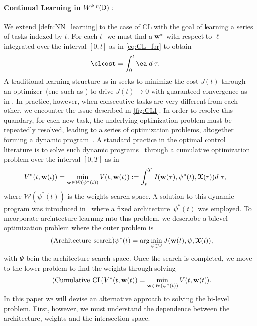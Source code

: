 \paragraph{Continual Learning in $W^{k,p}(\mathrm{D}):$}
We  extend \cref{defn:NN_learning} to the case of CL  with the goal of learning a series of tasks indexed by $t.$ For each $t,$ we must find a $\boldsymbol{\mathrm{w}}^*$  with respect to $\ell$ integrated over the interval $[0,t]$ as in \cref{eq:CL_for} to obtain
\begin{align*}
    \clcost & = \int_0^t \ea \;  d~\tau.
\end{align*}
A traditional learning structure as in \cite{CASpasunuru2019continual} seeks to minimize the cost $J(t)$ through an  optimizer~(one such as \cite{kingmaAdamMethodStochastic2017}) to drive $J(t) \rightarrow 0$ with guaranteed convergence as in \cite{kingmaAdamMethodStochastic2017}. In practice, however, when consecutive tasks are very different from each other, we encounter the issue described in \cref{fig:CL1}.  In order to resolve this quandary, for each new task, the underlying optimization problem must be repeatedly resolved, leading to a  series of optimization problems, altogether forming a dynamic program~\cite{bertsekas2012dynamic}. A standard practice in the optimal control literature is to solve such dynamic programs~\cite{bertsekas2012dynamic} through a cumulative optimization problem over the interval $[0,T]$ as in 
\begin{align*}
    V^*(t,\boldsymbol{\mathrm{w}}(t)) & = \min_{\boldsymbol{\mathrm{w}} \in \mathcal{W}(\psi^*(t))} V(t, \boldsymbol{\mathrm{w}}(t) ):= \int_t^T J(\boldsymbol{\mathrm{w}}(\tau),\psi^*(t), \boldsymbol{\mathcal{X}}(\tau)) d~\tau,
\end{align*}
where $\mathcal{W}(\psi^*(t))$ is the weights search space. A solution to this dynamic program was introduced in~\cite{raghavan2021formalizing, chakraborty2025understanding} where a fixed architecture~$\psi^*(t)$ was employed.  To incorporate architecture learning into this problem, we descriobe a bilevel- optimization problem where the outer problem is  
\begin{align}\label{eq:arch} \tag{Architecture search}
    \psi^*(t) & = \mathrm{arg }\min_{\psi\in \Psi} J(\boldsymbol{\mathrm{w}}(t),\psi,\boldsymbol{\mathcal{X}}(t)),
\end{align}
with $\Psi$ bein the architecture search space. Once the search is completed, we move to the lower problem to find the weights through solving 
\begin{align}\label{eq:clcum} \tag{Cumulative CL}
     V^*(t,\boldsymbol{\mathrm{w}}(t)) & = \min_{\boldsymbol{\mathrm{w}} \in \mathcal{W}(\psi^*(t))} V(t,\boldsymbol{\mathrm{w}}(t)).
\end{align}
In this paper we will devise an alternative approach to solving the bi-level problem. First, however,  we must understand the dependence between the architecture, weights and the intersection space.

